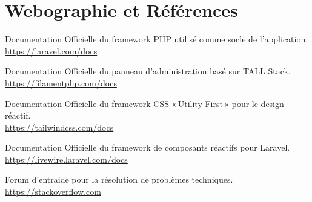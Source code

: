 \chapter*{Webographie et Références}

\vspace{0.3cm}

\begin{description}[
  style=nextline,
  leftmargin=1.5em,
  labelsep=0.5em,
  itemsep=10pt,
  font=\sffamily\bfseries\color{maincolor}
]
    \item[Laravel Framework]
    Documentation Officielle du framework PHP utilisé comme socle de l'application.\\
    {\color{darkaccent}\url{https://laravel.com/docs}}

    \item[Filament PHP]
    Documentation Officielle du panneau d'administration basé sur TALL Stack.\\
    {\color{darkaccent}\url{https://filamentphp.com/docs}}

    \item[Tailwind CSS]
    Documentation Officielle du framework CSS «\,Utility-First\,» pour le design réactif.\\
    {\color{darkaccent}\url{https://tailwindcss.com/docs}}

    \item[Livewire]
    Documentation Officielle du framework de composants réactifs pour Laravel.\\
    {\color{darkaccent}\url{https://livewire.laravel.com/docs}}

    \item[Stack Overflow]
    Forum d'entraide pour la résolution de problèmes techniques.\\
    {\color{darkaccent}\url{https://stackoverflow.com}}
\end{description}
